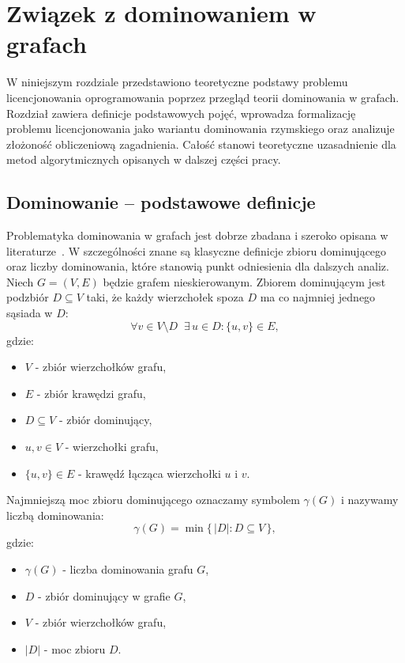 \chapter{Związek z dominowaniem w grafach}
\label{chap:roman_domination}

W niniejszym rozdziale przedstawiono teoretyczne podstawy problemu licencjonowania oprogramowania poprzez przegląd teorii dominowania w grafach. Rozdział zawiera definicje podstawowych pojęć, wprowadza formalizację problemu licencjonowania jako wariantu dominowania rzymskiego oraz analizuje złożoność obliczeniową zagadnienia. Całość stanowi teoretyczne uzasadnienie dla metod algorytmicznych opisanych w dalszej części pracy.

\section{Dominowanie -- podstawowe definicje}
Problematyka dominowania w grafach jest dobrze zbadana i szeroko opisana w literaturze~\cite{haynes1998domination}.
W szczególności znane są klasyczne definicje zbioru dominującego oraz liczby dominowania, które stanowią punkt odniesienia dla dalszych analiz.
Niech $G=(V,E)$ będzie grafem nieskierowanym.
Zbiorem dominującym jest podzbiór $D \subseteq V$ taki, że każdy wierzchołek spoza $D$ ma co najmniej jednego sąsiada w $D$:
\begin{equation}
  \forall v \in V \setminus D \;\; \exists\, u \in D : \{u,v\} \in E ,
  \label{eq:dominating_set_def}
\end{equation}
gdzie:
\begin{itemize}
  \item $V$ - zbiór wierzchołków grafu,
  \item $E$ - zbiór krawędzi grafu,
  \item $D \subseteq V$ - zbiór dominujący,
  \item $u,v \in V$ - wierzchołki grafu,
  \item $\{u,v\}\in E$ - krawędź łącząca wierzchołki $u$ i $v$.
\end{itemize}


Najmniejszą moc zbioru dominującego oznaczamy symbolem $\gamma(G)$ i nazywamy liczbą dominowania:
\begin{equation}
  \gamma(G) = \min \{\, |D| : D \subseteq V \,\},
  \label{eq:domination_number}
\end{equation}
gdzie:
\begin{itemize}
  \item $\gamma(G)$ - liczba dominowania grafu $G$,
  \item $D$ - zbiór dominujący w grafie $G$,
  \item $V$ - zbiór wierzchołków grafu,
  \item $|D|$ - moc zbioru $D$.
\end{itemize}




